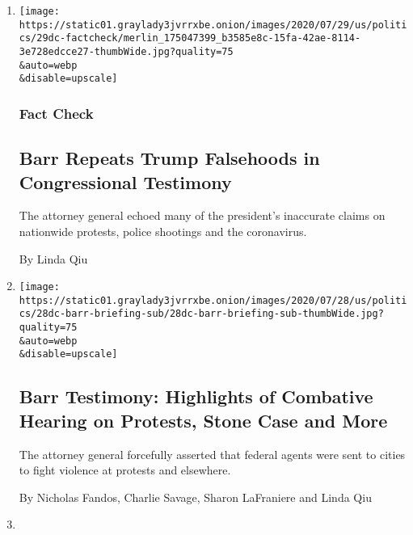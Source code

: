 \begin{enumerate}
\def\labelenumi{\arabic{enumi}.}
\item
  \href{/2020/07/29/us/politics/barr-trump-factcheck-congressional-testimony.html}{}

  \texttt{[image: https://static01.graylady3jvrrxbe.onion/images/2020/07/29/us/politics/29dc-factcheck/merlin\_175047399\_b3585e8c-15fa-42ae-8114-3e728edcce27-thumbWide.jpg?quality=75\\\&auto=webp\\\&disable=upscale]}

  \hypertarget{fact-check}{%
  \subsubsection{Fact Check}\label{fact-check}}

  \hypertarget{barr-repeats-trump-falsehoods-in-congressional-testimony}{%
  \subsection{Barr Repeats Trump Falsehoods in Congressional
  Testimony}\label{barr-repeats-trump-falsehoods-in-congressional-testimony}}

  The attorney general echoed many of the president's inaccurate claims
  on nationwide protests, police shootings and the coronavirus.

  By Linda Qiu
\item
  \href{/2020/07/28/us/politics/william-barr-house-judiciary-hearing.html}{}

  \texttt{[image: https://static01.graylady3jvrrxbe.onion/images/2020/07/28/us/politics/28dc-barr-briefing-sub/28dc-barr-briefing-sub-thumbWide.jpg?quality=75\\\&auto=webp\\\&disable=upscale]}

  \hypertarget{barr-testimony-highlights-of-combative-hearing-on-protests-stone-case-and-more}{%
  \subsection{Barr Testimony: Highlights of Combative Hearing on
  Protests, Stone Case and
  More}\label{barr-testimony-highlights-of-combative-hearing-on-protests-stone-case-and-more}}

  The attorney general forcefully asserted that federal agents were sent
  to cities to fight violence at protests and elsewhere.

  By Nicholas Fandos, Charlie Savage, Sharon LaFraniere and Linda Qiu
\item
  \href{/2020/07/24/us/politics/trump-election-battlegrounds-fact-check.html}{}


\end{enumerate}
